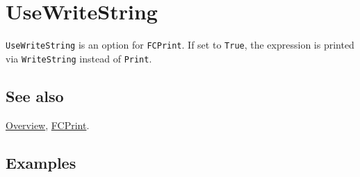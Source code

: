 \documentclass[../FeynCalcManual.tex]{subfiles}
\begin{document}
\hypertarget{usewritestring}{
\section{UseWriteString}\label{usewritestring}}

\texttt{UseWriteString} is an option for \texttt{FCPrint}. If set to
\texttt{True}, the expression is printed via \texttt{WriteString}
instead of \texttt{Print}.

\subsection{See also}

\hyperlink{toc}{Overview}, \hyperlink{fcprint}{FCPrint}.

\subsection{Examples}
\end{document}
